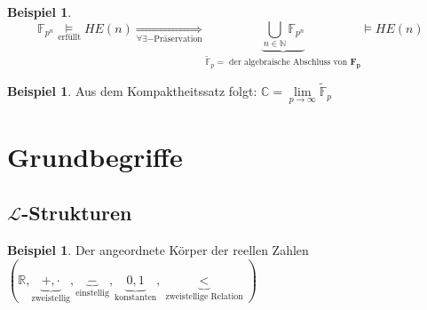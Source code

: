 \documentclass[12pt,parskip=full]{scrartcl}
\newcommand{\setN}{\mathbb{N}}
\newcommand{\setR}{\mathbb{R}}
\newcommand{\setC}{\mathbb{C}}
\theoremstyle{definition}
\newtheorem{example}[theorem]{Beispiel}
\begin{document}
	
	\begin{example}
		\begin{equation*}
			\mathbb{F}_{p^n} \underset{\text{erfüllt}}{\models} HE(n) \underset{\forall \exists- \text{Präservation}}{\Rightarrow} \underbrace{\bigcup_{n \in \setN} \mathbb{F}_{p^n}}_{\tilde{\mathbb{F}}_p = \text{ der algebraische Abschluss von } \mathbf{F_p}} \models HE(n)
		\end{equation*}
	\end{example}

	\begin{example}
		Aus dem Kompaktheitssatz folgt: $\setC = \lim\limits_{p \to \infty} \tilde{\mathbb{F}}_p$
	\end{example}

	\section{Grundbegriffe}
	
	\subsection{\texorpdfstring{$\mathcal{L}$-Strukturen}{L-Strukturen}}
	
	\begin{example}
		Der angeordnete Körper der reellen Zahlen $(\setR, \underbrace{+, \cdot}_\text{zweistellig}, \underbrace{-}_\text{einstellig}, \underbrace{0, 1}_\text{konstanten}, \underbrace{<}_\text{zweistellige Relation})$
	\end{example}
	
\end{document}
